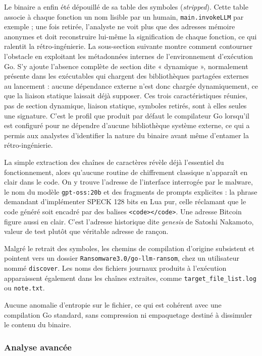 Le binaire a enfin été dépouillé de sa table des symboles (\emph{stripped}). Cette table associe à chaque fonction un nom lisible par un humain, \texttt{main.invokeLLM} par exemple ; une fois retirée, l'analyste ne voit plus que des adresses mémoire anonymes et doit reconstruire lui-même la signification de chaque fonction, ce qui ralentit la rétro-ingénierie. La sous-section suivante montre comment contourner l'obstacle en exploitant les métadonnées internes de l'environnement d'exécution Go. S'y ajoute l'absence complète de section dite « dynamique », normalement présente dans les exécutables qui chargent des bibliothèques partagées externes au lancement : aucune dépendance externe n'est donc chargée dynamiquement, ce que la liaison statique laissait déjà supposer. Ces trois caractéristiques réunies, pas de section dynamique, liaison statique, symboles retirés, sont à elles seules une signature. C'est le profil que produit par défaut le compilateur Go lorsqu'il est configuré pour ne dépendre d'aucune bibliothèque système externe, ce qui a permis aux analystes d'identifier la nature du binaire avant même d'entamer la rétro-ingénierie.

La simple extraction des chaînes de caractères révèle déjà l'essentiel du fonctionnement, alors qu'aucune routine de chiffrement classique n'apparaît en clair dans le code. On y trouve l'adresse de l'interface interrogée par le malware, le nom du modèle \texttt{gpt-oss:20b} et des fragments de prompts explicites : la phrase demandant d'implémenter SPECK 128 bits en Lua pur, celle réclamant que le code généré soit encadré par des balises \texttt{<code></code>}. Une adresse Bitcoin figure aussi en clair. C'est l'adresse historique dite \emph{genesis} de Satoshi Nakamoto, valeur de test plutôt que véritable adresse de rançon.

Malgré le retrait des symboles, les chemins de compilation d'origine subsistent et pointent vers un dossier \texttt{Ransomware3.0/go-llm-ransom}, chez un utilisateur nommé \texttt{discover}. Les noms des fichiers journaux produits à l'exécution apparaissent également dans les chaînes extraites, comme \texttt{target\_file\_list.log} ou \texttt{note.txt}.

Aucune anomalie d'entropie sur le fichier, ce qui est cohérent avec une compilation Go standard, sans compression ni empaquetage destiné à dissimuler le contenu du binaire.

\subsubsection{Analyse avancée}

